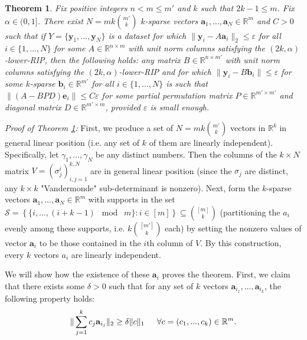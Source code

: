 \documentclass[journal,onecolumn]{IEEEtran}
\newtheorem{theorem}{Theorem}
\begin{document}

\begin{theorem}\label{RobustDUT}
Fix positive integers $n < m \leq m'$ and $k$ such that $2k - 1 \leq m$. Fix $\alpha \in (0,1]$. There exist $N =  mk{m' \choose k}$ $k$-sparse vectors $\mathbf{a}_1, \ldots, \mathbf{a}_N \in \mathbb{R}^m$ and $C > 0$ such that if $Y = \{\mathbf{y}_1, ..., \mathbf{y}_N \}$ is a dataset for which $\|\mathbf{y}_i - A\mathbf{a}_i\|_2 \leq \varepsilon$ for all $i \in \{1, \ldots, N\}$ for some $A \in \mathbb{R}^{n \times m}$ with unit norm columns satisfying the $(2k, \alpha)$-lower-RIP, then the following holds: any matrix $B \in \mathbb{R}^{n \times m'}$ with unit norm columns satisfying the $(2k,\alpha)$-lower-RIP and for which $\|\mathbf{y}_i - B\mathbf{b}_i\| \leq \varepsilon$ for some $k$-sparse $\mathbf{b}_i \in \mathbb{R}^{m'}$ for all $i \in \{1, \ldots, N\}$ is such that $\|(A - BPD)\mathbf{e}_i\| \leq C\varepsilon$ for some partial permutation matrix $P \in \mathbb{R}^{m' \times m'}$ and diagonal matrix $D \in \mathbb{R}^{m' \times m}$, provided $\varepsilon$ is small enough.
\end{theorem}

\emph{Proof of Theorem \ref{RobustDUT}:} First, we produce a set of $N = mk{m' \choose k}$ vectors in $\mathbb{R}^k$ in general linear position (i.e. any set of $k$ of them are linearly independent). Specifically, let $\gamma_1, ..., \gamma_N$ be any distinct numbers. Then the columns of the $k \times N$ matrix $V = (\sigma^i_j)^{k,N}_{i,j=1}$ are in general linear position (since the $\sigma_j$ are distinct, any $k \times k$ "Vandermonde" sub-determinant is nonzero). Next, form the $k$-sparse vectors $\mathbf{a}_1, \ldots, \mathbf{a}_N \in \mathbb{R}^m$ with supports in the set $\mathcal{S} = \left\{ \{i, \ldots, (i + k-1)\;\bmod\; m \}: i \in [m] \right\} \subseteq {[m] \choose k}$ (partitioning the $a_i$ evenly among these supports, i.e. $k{[m'] \choose k}$ each) by setting the nonzero values of vector $\mathbf{a}_i$ to be those contained in the $i$th column of $V$. By this construction, every $k$ vectors $a_i$ are linearly independent. 

We will show how the existence of these $\mathbf{a}_i$ proves the theorem. First, we claim that there exists some $\delta > 0$ such that for any set of $k$ vectors $\mathbf{a}_{i_1}, ..., \mathbf{a}_{i_k}$, the following property holds:
\begin{align}\label{DataSpread}
\|\sum_{j = 1}^k c_j \mathbf{a}_{i_j}\|_2 \geq \delta \|c\|_1 \indent \forall c = (c_1, ..., c_k) \in \mathbb{R}^m.
\end{align}
\end{document}
